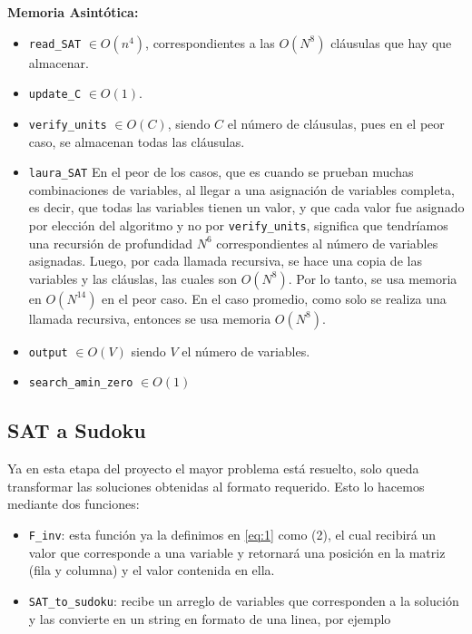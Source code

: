\documentclass[letterpaper,12pt]{article}
\begin{document}
\textbf{Memoria Asintótica:} 
\begin{itemize}
	\item \texttt{read\_SAT} $\in O(n^4)$, correspondientes a las $O(N^8)$ cl\'ausulas que hay que almacenar.

	\item \texttt{update\_C} $\in O(1)$.

	\item \texttt{verify\_units} $\in O(C)$, siendo $C$ el n\'umero de cl\'ausulas, pues en el peor caso, se almacenan todas las cl\'ausulas.

	\item \texttt{laura\_SAT} En el peor de los casos, que es cuando se prueban muchas combinaciones de variables, al llegar a una asignaci\'on de variables completa, es decir, que todas las variables tienen un valor, y que cada valor fue asignado por elecci\'on del algoritmo y no por \texttt{verify\_units}, significa que tendr\'iamos una recursi\'on de profundidad $N^6$ correspondientes al n\'umero de variables asignadas. Luego, por cada llamada recursiva, se hace una copia de las variables y las cl\'auslas, las cuales son $O(N^8)$. Por lo tanto, se usa memoria en $O(N^14)$ en el peor caso. En el caso promedio, como solo se realiza una llamada recursiva, entonces se usa memoria $O(N^8)$. 

	\item \texttt{output} $\in O(V)$ siendo $V$ el n\'umero de variables.

	\item \texttt{search\_amin\_zero} $\in O(1)$
\end{itemize}

\subsection{SAT a Sudoku}

Ya en esta etapa del proyecto el mayor problema está resuelto, solo queda transformar las soluciones obtenidas al formato requerido. Esto lo hacemos mediante dos funciones:

\begin{itemize}
	\item \texttt{F\_inv}: esta función ya la definimos en \ref{eq:1} como (2), el cual recibirá un valor que corresponde a una variable y retornará una posición en la matriz (fila y columna) y el valor contenida en ella.
	
	\item \texttt{SAT\_to\_sudoku}: recibe un arreglo de variables que corresponden a la solución y las convierte en un string en formato de una linea, por ejemplo
\end{itemize}
\end{document}
